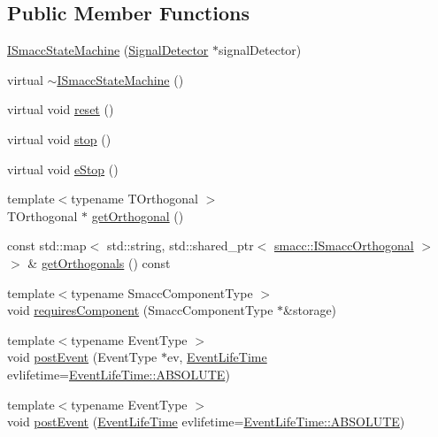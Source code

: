 \subsection*{Public Member Functions}
\begin{DoxyCompactItemize}
\item 
\hyperlink{classsmacc_1_1ISmaccStateMachine_a497c2185584adbec3298d4000277b75e}{I\+Smacc\+State\+Machine} (\hyperlink{classsmacc_1_1SignalDetector}{Signal\+Detector} $\ast$signal\+Detector)
\item 
virtual \hyperlink{classsmacc_1_1ISmaccStateMachine_a54bb9bac0008d3efc6a50cce88dce48e}{$\sim$\+I\+Smacc\+State\+Machine} ()
\item 
virtual void \hyperlink{classsmacc_1_1ISmaccStateMachine_a9e4b4fe4dda962642397993235c6eea0}{reset} ()
\item 
virtual void \hyperlink{classsmacc_1_1ISmaccStateMachine_adcb1b55e014f982a713a863ffb0261d3}{stop} ()
\item 
virtual void \hyperlink{classsmacc_1_1ISmaccStateMachine_a66a2900be8629748dab7a5c5ab6ae94e}{e\+Stop} ()
\item 
{\footnotesize template$<$typename T\+Orthogonal $>$ }\\T\+Orthogonal $\ast$ \hyperlink{classsmacc_1_1ISmaccStateMachine_a38b8b6e3d65b7de33020c9c397cf29bb}{get\+Orthogonal} ()
\item 
const std\+::map$<$ std\+::string, std\+::shared\+\_\+ptr$<$ \hyperlink{classsmacc_1_1ISmaccOrthogonal}{smacc\+::\+I\+Smacc\+Orthogonal} $>$ $>$ \& \hyperlink{classsmacc_1_1ISmaccStateMachine_a7f5b2882dbd077584767cb2533ed3c49}{get\+Orthogonals} () const
\item 
{\footnotesize template$<$typename Smacc\+Component\+Type $>$ }\\void \hyperlink{classsmacc_1_1ISmaccStateMachine_aa6b25e28f3bce24c4b356dc865a9eb7b}{requires\+Component} (Smacc\+Component\+Type $\ast$\&storage)
\item 
{\footnotesize template$<$typename Event\+Type $>$ }\\void \hyperlink{classsmacc_1_1ISmaccStateMachine_afcb6a216441aeaea2cba4e1ab12c366b}{post\+Event} (Event\+Type $\ast$ev, \hyperlink{namespacesmacc_a5063f47926ad2fe25120ed4b1e7b2c7e}{Event\+Life\+Time} evlifetime=\hyperlink{namespacesmacc_a5063f47926ad2fe25120ed4b1e7b2c7ea3a0bc063b6db8cae0361657958be836f}{Event\+Life\+Time\+::\+A\+B\+S\+O\+L\+U\+TE})
\item 
{\footnotesize template$<$typename Event\+Type $>$ }\\void \hyperlink{classsmacc_1_1ISmaccStateMachine_a7a68162b2cadb10e51ab0d28d7aed307}{post\+Event} (\hyperlink{namespacesmacc_a5063f47926ad2fe25120ed4b1e7b2c7e}{Event\+Life\+Time} evlifetime=\hyperlink{namespacesmacc_a5063f47926ad2fe25120ed4b1e7b2c7ea3a0bc063b6db8cae0361657958be836f}{Event\+Life\+Time\+::\+A\+B\+S\+O\+L\+U\+TE})

\end{DoxyCompactItemize}
